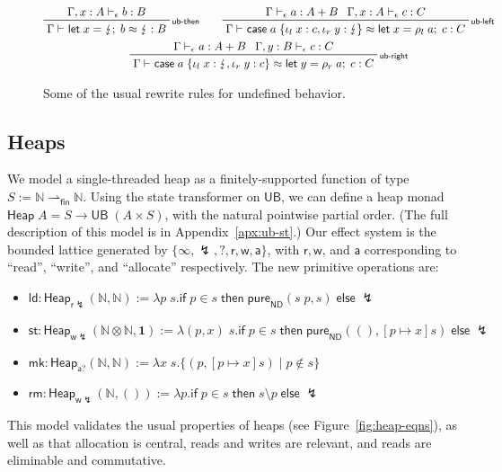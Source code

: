\documentclass[acmsmall,screen,review]{acmart}
\newcommand{\mb}[1]{\ensuremath{\mathbf{#1}}}
\newcommand{\ms}[1]{\ensuremath{\mathsf{#1}}}
\newcommand{\nats}{\mathbb{N}}
\newcommand{\lto}{:}
\newcommand{\linl}[1]{\iota_l\;{#1}}
\newcommand{\linr}[1]{\iota_r\;{#1}}
\newcommand{\letexpr}[3]{\ensuremath{\ms{let}\;#1 = #2;\;#3}}
\newcommand{\caseexpr}[5]{\ms{case}\;#1\;\{\linl{#2} \lto #3, \linr{#4} \lto #5\}}
\newcommand{\rle}[1]{{\scriptsize\textsf{#1}}}
\newcommand{\hasty}[4]{#1 \vdash_{#2} #3: {#4}}
\newcommand{\teqv}{\approx}
\newcommand{\tmeq}[5]{#1 \vdash_{#2} #3 \teqv #4 : {#5}}
\newcommand{\pto}{\rightharpoonup}
\newcommand{\fpto}{\pto_{\ms{fin}}}
\newcommand{\ubeff}{\lightning}
\begin{document}
\begin{figure}
  \begin{adjustbox}{minipage=1.1\textwidth,scale=0.9}
  \begin{gather*}
    \prftree[r]{\rle{ub-then}}
      {\hasty{\Gamma, x : A}{\epsilon}{b}{B}}
      {\tmeq{\Gamma}{}{\letexpr{x}{\ubeff}{b}}{\ubeff}{B}} \qquad
    \prftree[r]{\rle{ub-left}}
      {\hasty{\Gamma}{\epsilon}{a}{A + B}}
      {\hasty{\Gamma, x : A}{\epsilon}{c}{C}}
      {\tmeq{\Gamma}{}{\caseexpr{a}{x}{c}{y}{\ubeff}}{\letexpr{x}{\rho_l\;a}{c}}{C}}
    \\
    \prftree[r]{\rle{ub-right}}
      {\hasty{\Gamma}{\epsilon}{a}{A + B}}
      {\hasty{\Gamma, y : B}{\epsilon}{c}{C}}
      {\tmeq{\Gamma}{}{\caseexpr{a}{x}{\ubeff}{y}{c}}{\letexpr{y}{\rho_r\;a}{c}}{C}}
  \end{gather*}
  \end{adjustbox}
  \caption{
    Some of the usual rewrite rules for undefined behavior.
  }
  \Description{}
  \label{fig:ub-rewrites}
\end{figure}

\subsection{Heaps}

\label{ssec:heaps}

We model a single-threaded heap
as a finitely-supported function of type $S := \nats \fpto \nats$. Using the state transformer on
 $\ms{UB}$, we can define a heap monad 
$\ms{Heap}\;A = S \to \ms{UB}\;(A \times S)$, with the natural pointwise partial order.
(The full description of this model is in Appendix~\ref{apx:ub-st}.)
% 
Our effect system is the bounded lattice generated by 
$\{\infty, \ubeff, ?, \ms{r}, \ms{w}, \ms{a}\}$, with $\ms{r}, \ms{w}$, and $\ms{a}$ corresponding to 
``read'', ``write'', and ``allocate'' respectively. The new primitive operations are:
\begin{itemize}
  \item $\ms{ld} : \ms{Heap}_{\ms{r}\ubeff}(\nats, \nats) := 
    \lambda p\; s.
      \ms{if}\;p \in s\;\ms{then}\;\ms{pure}_{\ms{ND}}(s\;p, s)\;\ms{else}\;\ubeff
    $
  \item $\ms{st} : \ms{Heap}_{\ms{w}\ubeff}(\nats \otimes \nats, \mb{1}) :=
    \lambda (p, x)\; s.
      \ms{if}\;p \in s\;\ms{then}\;\ms{pure}_{\ms{ND}}((), [p \mapsto x]s)\;\ms{else}\;\ubeff
    $
  \item $\ms{mk} : \ms{Heap}_{\ms{a}?}(\nats, \nats) :=
    \lambda x\; s. \{(p, [p \mapsto x]s) \mid p \notin s\}
    $
  \item $\ms{rm} : \ms{Heap}_{\ms{w}\ubeff}(\nats, ()) :=
    \lambda p . \ms{if}\;p \in s\;\ms{then}\;s \setminus p\;\ms{else}\;\ubeff
    $
\end{itemize}
This model validates the usual properties of heaps (see Figure~\ref{fig:heap-eqns}), as well as
that allocation is central, reads and writes are relevant, and reads are eliminable and commutative.
%
\end{document}
